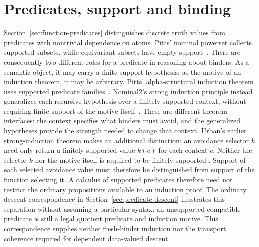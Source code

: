\section{Predicates, support and binding}
\label{sec:perspectives}

Section~\ref{sec:function-predicates} distinguishes discrete truth values
from predicates with nontrivial dependence on atoms. Pitts' nominal powerset
collects supported subsets, while equivariant subsets have empty
support~\cite[Section~2.5]{pitts2013}.
There are consequently two different roles for a predicate in reasoning
about binders. As a semantic object, it may carry a finite-support
hypothesis; as the motive of an induction theorem, it may be arbitrary.
Pitts' alpha-structural induction theorem uses supported predicate
families~\cite[Theorem~8.21]{pitts2013}. Nominal2's strong induction principle
instead generalizes each recursive hypothesis over a finitely supported
context, without requiring finite support of the motive
itself~\cite[Section~7, equation~(7.1)]{urbanKaliszyk2012}. These are different
theorem interfaces: the context specifies what binders must avoid, and the
generalized hypotheses provide the strength needed to change that context.
Urban's earlier strong-induction theorem makes an additional distinction:
an avoidance selector $k$ need only return a finitely supported value $k(c)$
for each context $c$. Neither the selector $k$ nor the motive itself is
required to be finitely supported \cite[Section~4, Theorem~2]{urban2008}.
Support of each selected avoidance value must therefore be distinguished
from support of the function selecting it.
A calculus of supported predicates therefore need not restrict the ordinary
propositions available to an induction proof.
The ordinary descent correspondence in Section~\ref{sec:predicate-descent}
illustrates this separation without assuming a particular syntax: an
unsupported compatible predicate is still a legal quotient predicate and
induction motive. This correspondence supplies neither fresh-binder induction
nor the transport coherence required for dependent data-valued descent.

